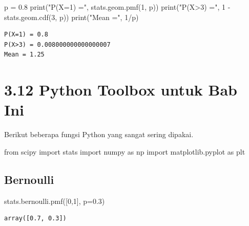 \documentclass[
  letterpaper,
  DIV=11,
  numbers=noendperiod]{scrreprt}
\newenvironment{Shaded}{\begin{snugshade}}{\end{snugshade}}
\newcommand{\BuiltInTok}[1]{\textcolor[rgb]{0.00,0.23,0.31}{#1}}
\newcommand{\DecValTok}[1]{\textcolor[rgb]{0.68,0.00,0.00}{#1}}
\newcommand{\FloatTok}[1]{\textcolor[rgb]{0.68,0.00,0.00}{#1}}
\newcommand{\ImportTok}[1]{\textcolor[rgb]{0.00,0.46,0.62}{#1}}
\newcommand{\NormalTok}[1]{\textcolor[rgb]{0.00,0.23,0.31}{#1}}
\newcommand{\OperatorTok}[1]{\textcolor[rgb]{0.37,0.37,0.37}{#1}}
\newcommand{\StringTok}[1]{\textcolor[rgb]{0.13,0.47,0.30}{#1}}
\begin{document}
\begin{Shaded}
\begin{Highlighting}[]
\NormalTok{p }\OperatorTok{=} \FloatTok{0.8}
\BuiltInTok{print}\NormalTok{(}\StringTok{"P(X=1) ="}\NormalTok{, stats.geom.pmf(}\DecValTok{1}\NormalTok{, p))}
\BuiltInTok{print}\NormalTok{(}\StringTok{"P(X\textgreater{}3) ="}\NormalTok{, }\DecValTok{1} \OperatorTok{{-}}\NormalTok{ stats.geom.cdf(}\DecValTok{3}\NormalTok{, p))}
\BuiltInTok{print}\NormalTok{(}\StringTok{"Mean ="}\NormalTok{, }\DecValTok{1}\OperatorTok{/}\NormalTok{p)}
\end{Highlighting}
\end{Shaded}

\begin{verbatim}
P(X=1) = 0.8
P(X>3) = 0.008000000000000007
Mean = 1.25
\end{verbatim}

\section{3.12 Python Toolbox untuk Bab
Ini}\label{python-toolbox-untuk-bab-ini}

Berikut beberapa fungsi Python yang sangat sering dipakai.

\begin{Shaded}
\begin{Highlighting}[]
\ImportTok{from}\NormalTok{ scipy }\ImportTok{import}\NormalTok{ stats}
\ImportTok{import}\NormalTok{ numpy }\ImportTok{as}\NormalTok{ np}
\ImportTok{import}\NormalTok{ matplotlib.pyplot }\ImportTok{as}\NormalTok{ plt}
\end{Highlighting}
\end{Shaded}

\subsection{Bernoulli}\label{bernoulli-1}

\begin{Shaded}
\begin{Highlighting}[]
\NormalTok{stats.bernoulli.pmf([}\DecValTok{0}\NormalTok{,}\DecValTok{1}\NormalTok{], p}\OperatorTok{=}\FloatTok{0.3}\NormalTok{)}
\end{Highlighting}
\end{Shaded}

\begin{verbatim}
array([0.7, 0.3])
\end{verbatim}
\end{document}
